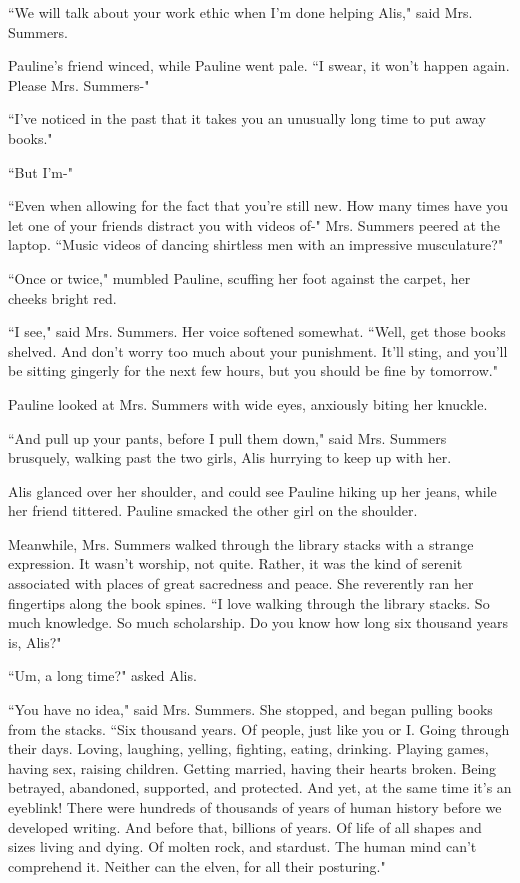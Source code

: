 \documentclass{report}
\begin{document}
``We will talk about your work ethic when I'm done helping Alis," said Mrs. Summers. 

Pauline's friend winced, while Pauline went pale. ``I swear, it won't happen again. Please Mrs. Summers-"

``I've noticed in the past that it takes you an unusually long time to put away books."

``But I'm-"

``Even when allowing for the fact that you're still new. How many
times have you let one of your friends distract you with videos of-" Mrs. Summers peered at the laptop. ``Music videos of dancing shirtless men with an impressive
musculature?"

``Once or twice," mumbled Pauline, scuffing her foot against the carpet, her cheeks bright red.

``I see," said Mrs. Summers. Her voice softened somewhat. ``Well, get those books shelved. And don't worry too much about your punishment. It'll sting, and you'll be sitting 
gingerly for the next few hours, but you should be fine by tomorrow."

Pauline looked at Mrs. Summers with wide eyes, anxiously biting her knuckle.

``And pull up your pants, before I pull them down," said Mrs. Summers brusquely, walking past the two girls, Alis hurrying to keep up with her.

Alis glanced over her shoulder, and could see Pauline hiking up her jeans, while her friend tittered. Pauline smacked the other girl on the shoulder.

Meanwhile, Mrs. Summers walked through the library stacks with a strange expression. It wasn't worship, not quite. Rather, it was the kind of serenit associated with places of
great sacredness and peace. She reverently ran her fingertips along the book spines. ``I love walking through the library
stacks. So much knowledge. So much scholarship. Do you know how long six thousand years is, Alis?"

``Um, a long time?" asked Alis.

``You have no idea," said Mrs. Summers. She stopped, and began pulling books from the stacks. ``Six thousand years. Of people, just like you or I. Going through their days.
Loving, laughing, yelling, fighting, eating, drinking. Playing games, having sex, raising children. Getting married, having their hearts broken. Being betrayed, 
abandoned, supported, and protected. And yet, at the same time it's an eyeblink! There were hundreds of thousands of years of human history before we developed writing. 
And before
that, billions of years. Of life of all shapes and sizes living and dying. Of molten rock, and stardust. The human mind can't comprehend it. Neither can the elven, for all
their posturing."
\end{document}
